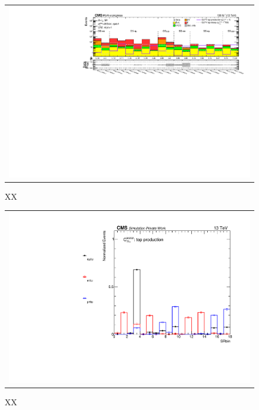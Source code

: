 \begin{figure}[tbh!]
 \begin{center}
 \begin{tabular}{c}
 \includegraphics[width=\textwidth]{figures/Part4/Evt/Summary_llOffZMetg20B1}
 \end{tabular}
 \caption{XX}
 \label{fig:Summary}
 \end{center}
 \end{figure}
 
 \begin{figure}[tbh!]
 \begin{center}
 \begin{tabular}{c}
 \includegraphics[width=\textwidth]{figures/Part4/Evt/SRbin}
 \end{tabular}
 \caption{XX}
 \label{fig:Summary}
 \end{center}
 \end{figure}
 
